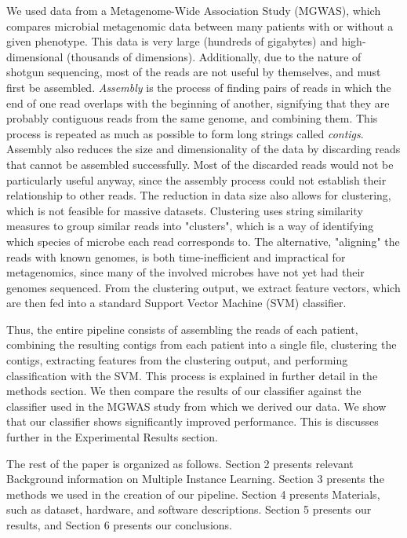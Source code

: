 We used data from a Metagenome-Wide Association Study (MGWAS), which compares microbial metagenomic data between many patients with or without a given phenotype. This data is very large (hundreds of gigabytes) and high-dimensional (thousands of dimensions). Additionally, due to the nature of shotgun sequencing, most of the reads are not useful by themselves, and must first be assembled. \emph{Assembly} is the process of finding pairs of reads in which the end of one read overlaps with the beginning of another, signifying that they are probably contiguous reads from the same genome, and combining them. This process is repeated as much as possible to form long strings called \emph{contigs}. Assembly also reduces the size and dimensionality of the data by discarding reads that cannot be assembled successfully. Most of the discarded reads would not be particularly useful anyway, since the assembly process could not establish their relationship to other reads. The reduction in data size also allows for clustering, which is not feasible for massive datasets. Clustering uses string similarity measures to group similar reads into "clusters", which is a way of identifying which species of microbe each read corresponds to. The alternative, "aligning" the reads with known genomes, is both time-inefficient and impractical for metagenomics, since many of the involved microbes have not yet had their genomes sequenced. From the clustering output, we extract feature vectors, which are then fed into a standard Support Vector Machine (SVM) classifier. 

Thus, the entire pipeline consists of assembling the reads of each patient, combining the resulting contigs from each patient into a single file, clustering the contigs, extracting features from the clustering output, and performing classification with the SVM. This process is explained in further detail in the methods section. We then compare the results of our classifier against the classifier used in the MGWAS study from which we derived our data. We show that our classifier shows significantly improved performance. This is discusses further in the Experimental Results section.

The rest of the paper is organized as follows. Section 2 presents relevant Background information on  Multiple Instance Learning. Section 3 presents the methods we used in the creation of our pipeline. Section 4 presents Materials, such as dataset, hardware, and software descriptions. Section 5 presents our results, and Section 6 presents our conclusions.